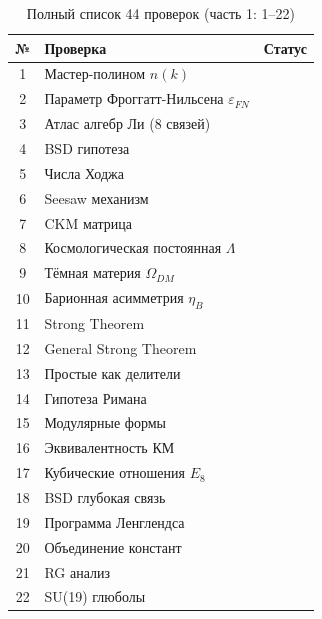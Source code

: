 \documentclass[12pt,a4paper,twoside]{article}
\newcommand{\EPS}{\varepsilon}
\newcommand{\checkmarkgreen}{\textcolor{emerald}{\checkmark}}
\theoremstyle{definition}
\begin{document}
\begin{table}[H]
\centering
\small
\caption{Полный список 44 проверок (часть 1: 1--22)}
\label{tab:44_breakdown_a}
\begin{tabular}{c|l|c}
\toprule
\textbf{№} & \textbf{Проверка} & \textbf{Статус} \\
\midrule
1 & Мастер-полином $n(k)$ & \checkmarkgreen \\
2 & Параметр Фроггатт-Нильсена $\EPS_{FN}$ & \checkmarkgreen \\
3 & Атлас алгебр Ли (8 связей) & \checkmarkgreen \\
4 & BSD гипотеза & \checkmarkgreen \\
5 & Числа Ходжа & \checkmarkgreen \\
6 & Seesaw механизм & \checkmarkgreen \\
7 & CKM матрица & \checkmarkgreen \\
8 & Космологическая постоянная $\Lambda$ & \checkmarkgreen \\
9 & Тёмная материя $\Omega_{DM}$ & \checkmarkgreen \\
10 & Барионная асимметрия $\eta_B$ & \checkmarkgreen \\
11 & Strong Theorem & \checkmarkgreen \\
12 & General Strong Theorem & \checkmarkgreen \\
13 & Простые как делители & \checkmarkgreen \\
14 & Гипотеза Римана & \checkmarkgreen \\
15 & Модулярные формы & \checkmarkgreen \\
16 & Эквивалентность КМ & \checkmarkgreen \\
17 & Кубические отношения $E_8$ & \checkmarkgreen \\
18 & BSD глубокая связь & \checkmarkgreen \\
19 & Программа Ленглендса & \checkmarkgreen \\
20 & Объединение констант & \checkmarkgreen \\
21 & RG анализ & \checkmarkgreen \\
22 & SU(19) глюболы & \checkmarkgreen \\
\bottomrule
\end{tabular}
\end{table}
\end{document}
